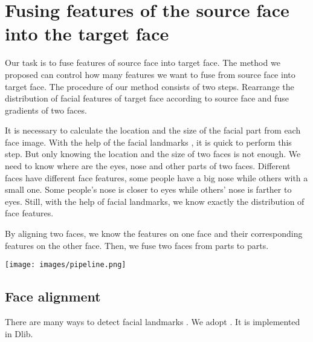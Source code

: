 \section{Fusing features of the source face into the target face }
Our task is to fuse features of source face into target face. The method we proposed can control how many features we want to fuse from source face into target face. The procedure of our method consists of two steps. Rearrange the distribution of facial features of target face according to source face and fuse gradients of two faces.

It is necessary to calculate the location and the size of the facial part from each face image. With the help of the facial landmarks \cite{fld}, it is quick to perform this step. But only knowing the location and the size of two faces is not enough. We need to know where are the eyes, nose and other parts of two faces. Different faces have different face features, some people have a big nose while others with a small one. Some people's nose is closer to eyes while others' nose is farther to eyes. Still, with the help of facial landmarks, we know exactly the distribution of face features.

By aligning two faces, we know the features on one face and their corresponding features on the other face. Then, we fuse two faces from parts to parts.
\begin{center}
    \texttt{[image: images/pipeline.png]}
\end{center}

\subsection{Face alignment}
There are many ways to detect facial landmarks \cite{fld2}\cite{fld3}\cite{fld4}\cite{fld}. We adopt \cite{fld}. It is implemented in Dlib.

